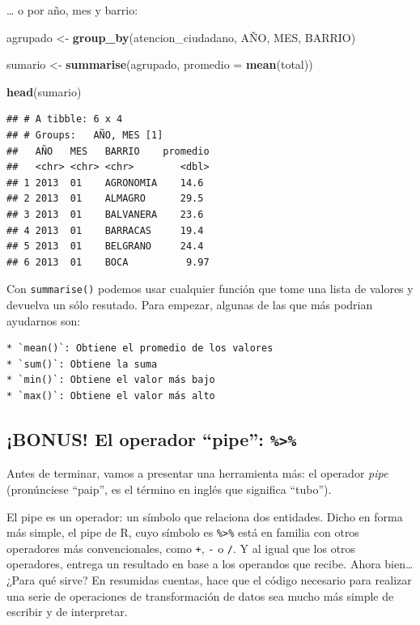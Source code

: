 \documentclass[spanish,]{book}
\newenvironment{Shaded}{\begin{snugshade}}{\end{snugshade}}
\newcommand{\DataTypeTok}[1]{\textcolor[rgb]{0.13,0.29,0.53}{#1}}
\newcommand{\KeywordTok}[1]{\textcolor[rgb]{0.13,0.29,0.53}{\textbf{#1}}}
\newcommand{\NormalTok}[1]{#1}
\newcommand{\StringTok}[1]{\textcolor[rgb]{0.31,0.60,0.02}{#1}}
\begin{document}
\ldots{} o por año, mes y barrio:

\begin{Shaded}
\begin{Highlighting}[]
\NormalTok{agrupado <-}\StringTok{ }\KeywordTok{group_by}\NormalTok{(atencion_ciudadano, AÑO, MES, BARRIO)}

\NormalTok{sumario <-}\StringTok{ }\KeywordTok{summarise}\NormalTok{(agrupado, }\DataTypeTok{promedio =} \KeywordTok{mean}\NormalTok{(total))}

\KeywordTok{head}\NormalTok{(sumario)}
\end{Highlighting}
\end{Shaded}

\begin{verbatim}
## # A tibble: 6 x 4
## # Groups:   AÑO, MES [1]
##   AÑO   MES   BARRIO    promedio
##   <chr> <chr> <chr>        <dbl>
## 1 2013  01    AGRONOMIA    14.6 
## 2 2013  01    ALMAGRO      29.5 
## 3 2013  01    BALVANERA    23.6 
## 4 2013  01    BARRACAS     19.4 
## 5 2013  01    BELGRANO     24.4 
## 6 2013  01    BOCA          9.97
\end{verbatim}

Con \texttt{summarise()} podemos usar cualquier función que tome una lista de valores y devuelva un sólo resutado. Para empezar, algunas de las que más podrian ayudarnos son:

\begin{verbatim}
* `mean()`: Obtiene el promedio de los valores
* `sum()`: Obtiene la suma
* `min()`: Obtiene el valor más bajo
* `max()`: Obtiene el valor más alto
\end{verbatim}

\hypertarget{bonus-el-operador-pipe}{%
\subsection{\texorpdfstring{¡BONUS! El operador ``pipe'': \texttt{\%\textgreater{}\%}}{¡BONUS! El operador ``pipe'': \%\textgreater{}\%}}\label{bonus-el-operador-pipe}}

Antes de terminar, vamos a presentar una herramienta más: el operador \emph{pipe} (pronúnciese ``paip'', es el término en inglés que significa ``tubo'').

El pipe es un operador: un símbolo que relaciona dos entidades. Dicho en forma más simple, el pipe de R, cuyo símbolo es \texttt{\%\textgreater{}\%} está en familia con otros operadores más convencionales, como \texttt{+}, \texttt{-} o \texttt{/}. Y al igual que los otros operadores, entrega un resultado en base a los operandos que recibe. Ahora bien\ldots{} ¿Para qué sirve? En resumidas cuentas, hace que el código necesario para realizar una serie de operaciones de transformación de datos sea mucho más simple de escribir y de interpretar.
\end{document}
